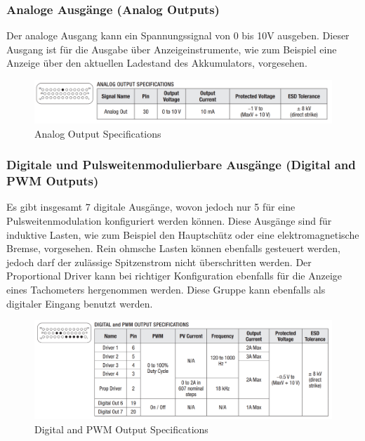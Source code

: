 \subsubsection{Analoge Ausgänge (Analog Outputs)}
Der analoge Ausgang kann ein Spannungssignal von 0 bis 10V ausgeben. Dieser Ausgang ist für die Ausgabe über Anzeigeinstrumente, wie zum Beispiel eine Anzeige über den aktuellen Ladestand des Akkumulators, vorgesehen.

\begin{figure}[H]
	\begin{center}
		\includegraphics[scale=0.5]{figures/hcis/Analog_Output_Specifications.png}
		\caption{Analog Output Specifications}
	\end{center}
\end{figure}



\subsubsection{Digitale und Pulsweitenmodulierbare Ausgänge (Digital and PWM Outputs)}
Es gibt insgesamt 7 digitale Ausgänge, wovon jedoch nur 5 für eine Pulsweitenmodulation konfiguriert werden können. Diese Ausgänge sind für induktive Lasten, wie zum Beispiel den Hauptschütz oder eine elektromagnetische Bremse, vorgesehen. Rein ohmsche Lasten können ebenfalls gesteuert werden, jedoch darf der zulässige Spitzenstrom nicht überschritten werden. Der Proportional Driver kann bei richtiger Konfiguration ebenfalls für die Anzeige eines Tachometers hergenommen werden. Diese Gruppe kann ebenfalls als digitaler Eingang benutzt werden.

\begin{figure}[H]
	\begin{center}
		\includegraphics[scale=0.5]{figures/hcis/Digital_PWM_Output_Specifications.png}
		\caption{Digital and PWM Output Specifications}
	\end{center}
\end{figure}



